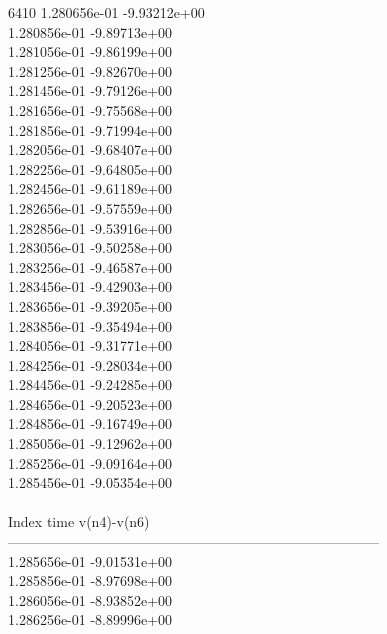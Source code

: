 6410	1.280656e-01	-9.93212e+00	\\ 	1.280856e-01	-9.89713e+00	\\ 	1.281056e-01	-9.86199e+00	\\ 	1.281256e-01	-9.82670e+00	\\ 	1.281456e-01	-9.79126e+00	\\ 	1.281656e-01	-9.75568e+00	\\ 	1.281856e-01	-9.71994e+00	\\ 	1.282056e-01	-9.68407e+00	\\ 	1.282256e-01	-9.64805e+00	\\ 	1.282456e-01	-9.61189e+00	\\ 	1.282656e-01	-9.57559e+00	\\ 	1.282856e-01	-9.53916e+00	\\ 	1.283056e-01	-9.50258e+00	\\ 	1.283256e-01	-9.46587e+00	\\ 	1.283456e-01	-9.42903e+00	\\ 	1.283656e-01	-9.39205e+00	\\ 	1.283856e-01	-9.35494e+00	\\ 	1.284056e-01	-9.31771e+00	\\ 	1.284256e-01	-9.28034e+00	\\ 	1.284456e-01	-9.24285e+00	\\ 	1.284656e-01	-9.20523e+00	\\ 	1.284856e-01	-9.16749e+00	\\ 	1.285056e-01	-9.12962e+00	\\ 	1.285256e-01	-9.09164e+00	\\ 	1.285456e-01	-9.05354e+00	\\ \hline
\\ \hline
Index   time            v(n4)-v(n6)     \\ \hline
--------------------------------------------------------------------------------\\ 	1.285656e-01	-9.01531e+00	\\ 	1.285856e-01	-8.97698e+00	\\ 	1.286056e-01	-8.93852e+00	\\ 	1.286256e-01	-8.89996e+00	\\ \hline
